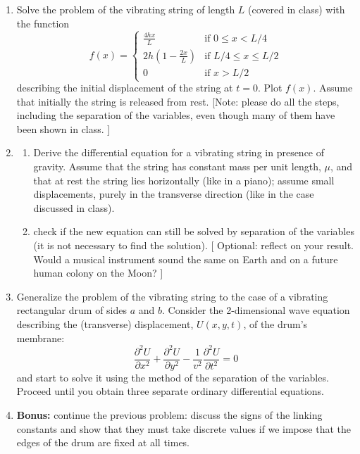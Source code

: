 \documentclass[fleqn]{article}
\begin{document}
  \begin{enumerate}
    \item  Solve the problem of the vibrating string of length $L$ (covered in class) with the function
      $$f(x)=\begin{cases} \frac{4 h x}{L} &\mbox{if } 0 \leq x < L/4 \\ 
      2 h \left( 1 - \frac{2x}{L}\right) &\mbox{if }  L/4  \leq x \leq L/2 \\ 
      0 & \mbox{if } x > L/2 \end{cases} $$
      describing the initial displacement of the string at $t=0$.  Plot $f(x)$.   Assume that initially the string is released from rest. [Note: please do all the steps, including the separation of the variables, even though many of them have been shown in class. ]


    \item  

      \begin{enumerate}
      \item Derive the differential equation for a  vibrating string in presence of gravity. Assume that the string has constant mass per unit length, $\mu$, and that at rest the string lies horizontally (like in a piano); assume small displacements, purely in the transverse direction (like in the case discussed in class).  

      \item check if the new equation can still be solved by separation of the variables (it is not necessary to find the solution).  [ Optional: reflect on your result. Would a musical instrument sound the same on Earth and on a future human colony on the Moon?  ] 

      \end{enumerate}

    \item Generalize the problem of the vibrating string to the case of a vibrating rectangular drum of sides $a$ and $b$. Consider the 2-dimensional wave equation describing the (transverse) displacement, $U(x,y,t)$, of the drum's membrane:
    $$
    \frac{\partial^2 U}{\partial x^2} + \frac{\partial^2 U}{\partial y^2}  - \frac{1}{v^2}\frac{\partial^2 U}{\partial t^2}=0
    $$
    and start to solve it using the method of the separation of the variables. Proceed until you obtain three separate ordinary differential equations. 
    
    \item {\bf Bonus: } continue the previous problem: discuss the signs of the linking constants and show that they must take discrete values if we impose that the edges of the drum are fixed at all times. 
  \end{enumerate}
\end{document}
